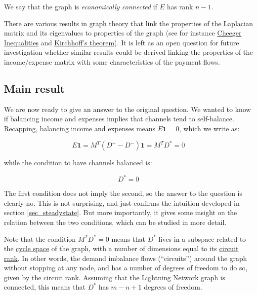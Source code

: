 \documentclass[a4paper]{article}
\begin{document}
We say that the graph is \emph{economically connected} if $E$ has rank $n-1$.

There are various results in graph theory that link the properties of the Laplacian matrix and its eigenvalues to properties of the graph (see for instance \href{https://en.wikipedia.org/wiki/Cheeger_constant_(graph_theory)#Cheeger_Inequalities}{Cheeger Inequalities} and \href{https://en.wikipedia.org/wiki/Kirchhoff\%27s_theorem}{Kirchhoff's theorem}). It is left as an open question for future investigation whether similar results could be derived linking the properties of the income/expense matrix with some characteristics of the payment flows.

\subsection{Main result}\label{sec_main}

We are now ready to give an answer to the original question. We wanted to know if balancing income and expenses implies that channels tend to self-balance. Recapping, balancing income and expenses means $E \mathbf{1} = 0$, which we write as:

\begin{equation}
E \mathbf{1} = M^T (D^+ - D^-) \mathbf{1} = M^T D^* = 0
\end{equation}

while the condition to have channels balanced is:

\begin{equation}
D^* = 0
\end{equation}

The first condition does not imply the second, so the answer to the question is clearly no. This is not surprising, and just confirms the intuition developed in section \ref{sec_steadystate}. But more importantly, it gives some insight on the relation between the two conditions, which can be studied in more detail.

Note that the condition $M^T D^* = 0$ means that $D^*$ lives in a subspace related to the \href{https://en.wikipedia.org/wiki/Cycle_space}{cycle space} of the graph, with a number of dimensions equal to its \href{https://en.wikipedia.org/wiki/Circuit_rank}{circuit rank}. In other words, the demand imbalance flows (``circuits'') around the graph without stopping at any node, and has a number of degrees of freedom to do so, given by the circuit rank. Assuming that the Lightning Network graph is connected, this means that $D^*$ has $m-n+1$ degrees of freedom.
\end{document}
